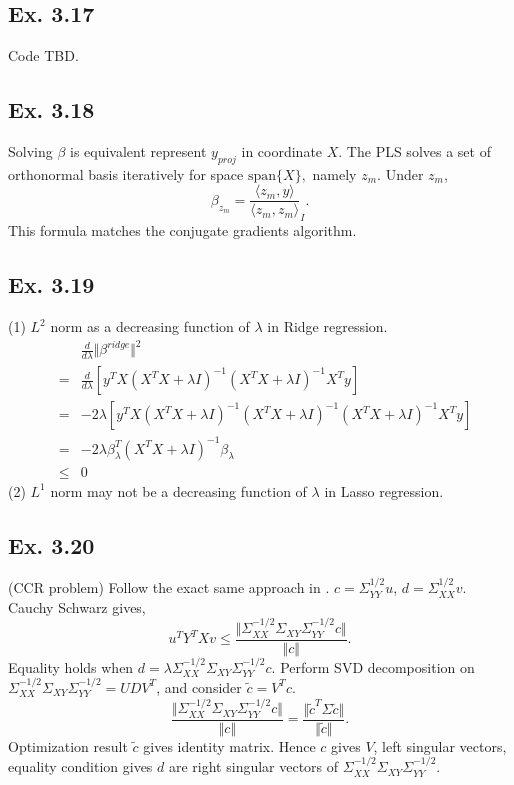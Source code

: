 \subsection*{Ex. 3.17}
Code TBD.

\subsection*{Ex. 3.18}
Solving $\beta$ is equivalent represent $y_{proj}$ in coordinate $X$. The PLS solves a set of orthonormal basis iteratively for space $\mbox{span}\{X\},$ namely $z_{m}.$ Under $z_{m}$,
$$\beta_{z_m}=\frac{\langle z_{m}, y\rangle}{\langle z_{m}, z_{m}\rangle}_{I}.$$
This formula matches the conjugate gradients algorithm.

\subsection*{Ex. 3.19}
(1) $L^2$ norm as a decreasing function of $\lambda$ in Ridge regression.
\begin{eqnarray*}
    &&\frac{d}{d\lambda} \Vert \beta^{ridge}\Vert^2\\
    &=&\frac{d}{d\lambda} [y^TX(X^TX + \lambda I)^{-1}(X^TX + \lambda I)^{-1}X^Ty]\\
    &=&-2\lambda [y^TX(X^TX + \lambda I)^{-1}(X^TX + \lambda I)^{-1}(X^TX + \lambda I)^{-1}X^Ty]\\
    &=&-2\lambda \beta_{\lambda}^T(X^TX + \lambda I)^{-1}\beta_{\lambda} \\
    &\leq& 0
\end{eqnarray*}
(2) $L^1$ norm may not be a decreasing function of $\lambda$ in Lasso regression.

\subsection*{Ex. 3.20}
(CCR problem) Follow the exact same approach in \cite{Wiki_CCR}.
$c = \Sigma_{YY}^{1/2}u$, $d = \Sigma_{XX}^{1/2}v$.
Cauchy Schwarz gives,
$$u^TY^TXv\leq\frac{\Vert \Sigma_{XX}^{-1/2}\Sigma_{XY}\Sigma_{YY}^{-1/2}c \Vert}{\Vert c \Vert}.$$
Equality holds when $d = \lambda \Sigma_{XX}^{-1/2}\Sigma_{XY}\Sigma_{YY}^{-1/2}c.$ Perform SVD decomposition on $ \Sigma_{XX}^{-1/2}\Sigma_{XY}\Sigma_{YY}^{-1/2} = UD V^{T}$, and consider $\tilde{c} = V^T c.$
$$\frac{\Vert \Sigma_{XX}^{-1/2}\Sigma_{XY}\Sigma_{YY}^{-1/2}c \Vert}{\Vert c \Vert}=\frac{\Vert\tilde{c}^T \Sigma \tilde{c}\Vert}{\Vert \tilde{c}\Vert}.$$
Optimization result $\tilde{c}$ gives identity matrix. Hence $c$ gives $V$, left singular vectors, equality condition gives $d$ are right singular vectors of $\Sigma_{XX}^{-1/2}\Sigma_{XY}\Sigma_{YY}^{-1/2}$.


